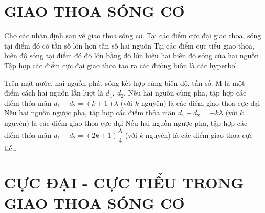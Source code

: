 \section{GIAO THOA SÓNG CƠ}
\begin{ex}%
Cho các nhận định sau về giao thoa sóng cơ.
{Tại các điểm cực đại giao thoa, sóng tại điểm đó có tần số lớn hơn tần số hai nguồn}
{\True Tại các điểm cực tiểu giao thoa, biên độ sóng tại điểm đó độ lớn bằng độ lớn hiệu hai biên độ sóng của hai nguồn}
{Tập hợp các điểm cực đại giao thoa tạo ra các đường luôn là các hyperbol}
\loigiai{
\begin{itemchoice}
\itemch
\itemch
\itemch
\itemch
\end{itemchoice}
}
\end{ex} 

\begin{ex}%
Trên mặt nước, hai nguồn phát sóng kết hợp cùng biên độ, tần số. M là một điểm cách hai nguồn lần lượt là $d_1, ~d_2$.
{\True Nếu hai nguồn cùng pha, tập hợp các điểm thỏa mãn $d_1-d_2=(k+1) \lambda$ (với $k$ nguyên) là các điểm giao thoa cực đại}
{Nếu hai nguồn ngược pha, tập hợp các điểm thỏa mãn $d_1-d_2=-k \lambda$ (với $k$ nguyên) là các điểm giao thoa cực đại}
{Nếu hai nguồn ngược pha, tập hợp các điểm thỏa mãn $d_1-d_2=(2 k+1) \dfrac{\lambda}{4}$ (với $k$ nguyên) là các điểm giao thoa cực tiểu} 
\loigiai{
\begin{itemchoice}
\itemch
\itemch
\itemch
\itemch
\end{itemchoice}
}
\end{ex} 



\section{CỰC ĐẠI - CỰC TIỂU TRONG GIAO THOA SÓNG CƠ}










